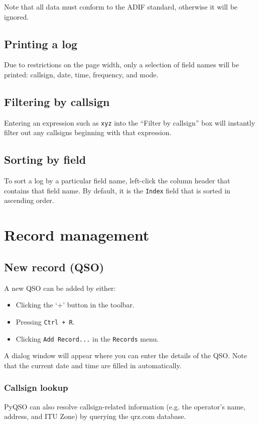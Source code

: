 \documentclass[11pt, a4paper]{report}
\begin{document}
Note that all data must conform to the ADIF standard, otherwise it will be ignored.

\subsection{Printing a log}
Due to restrictions on the page width, only a selection of field names will be printed: callsign, date, time, frequency, and mode.

\subsection{Filtering by callsign}
Entering an expression such as \texttt{xyz} into the ``Filter by callsign'' box will instantly filter out any callsigns beginning with that expression.

\subsection{Sorting by field}
To sort a log by a particular field name, left-click the column header that contains that field name. By default, it is the \texttt{Index} field that is sorted in ascending order.

\section{Record management}

\subsection{New record (QSO)}
A new QSO can be added by either:
\begin{itemize}
  \item Clicking the `+' button in the toolbar.
  \item Pressing \texttt{Ctrl + R}.
  \item Clicking \texttt{Add Record...} in the \texttt{Records} menu.
\end{itemize}
A dialog window will appear where you can enter the details of the QSO. Note that the current date and time are filled in automatically.

\subsubsection{Callsign lookup}
PyQSO can also resolve callsign-related information (e.g. the operator's name, address, and ITU Zone) by querying the qrz.com database.
\end{document}
